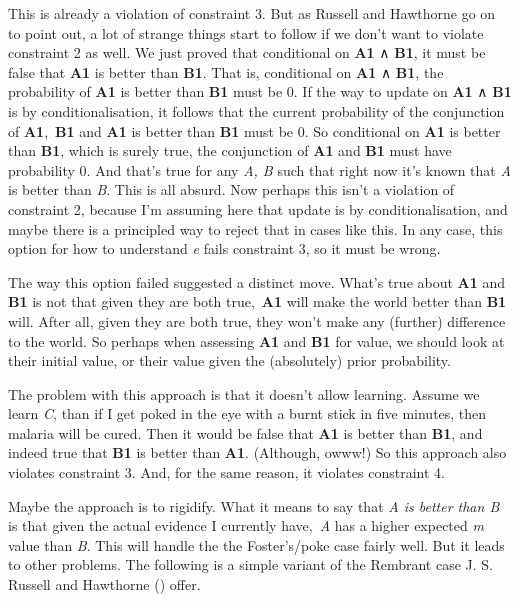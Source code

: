 \documentclass[
  10pt,
  letterpaper,
  twoside]{scrbook}
\begin{document}
This is already a violation of constraint 3. But as Russell and
Hawthorne go on to point out, a lot of strange things start to follow if
we don't want to violate constraint 2 as well. We just proved that
conditional on \textbf{A1} ∧ \textbf{B1}, it must be false that
\textbf{A1} is better than \textbf{B1}. That is, conditional on
\textbf{A1} ∧ \textbf{B1}, the probability of \textbf{A1} is better than
\textbf{B1} must be 0. If the way to update on \textbf{A1} ∧ \textbf{B1}
is by conditionalisation, it follows that the current probability of the
conjunction of \textbf{A1},~\textbf{B1} and \textbf{A1} is better than
\textbf{B1} must be 0. So conditional on \textbf{A1} is better than
\textbf{B1}, which is surely true, the conjunction of \textbf{A1} and
\textbf{B1} must have probability 0. And that's true for any \emph{A, B}
such that right now it's known that \emph{A} is better than \emph{B}.
This is all absurd. Now perhaps this isn't a violation of constraint 2,
because I'm assuming here that update is by conditionalisation, and
maybe there is a principled way to reject that in cases like this. In
any case, this option for how to understand \emph{e} fails constraint 3,
so it must be wrong.

The way this option failed suggested a distinct move. What's true about
\textbf{A1} and \textbf{B1} is not that given they are both
true,~\textbf{A1} will make the world better than \textbf{B1} will.
After all, given they are both true, they won't make any (further)
difference to the world. So perhaps when assessing \textbf{A1} and
\textbf{B1} for value, we should look at their initial value, or their
value given the (absolutely) prior probability.

The problem with this approach is that it doesn't allow learning. Assume
we learn \emph{C}, than if I get poked in the eye with a burnt stick in
five minutes, then malaria will be cured. Then it would be false that
\textbf{A1} is better than \textbf{B1}, and indeed true that \textbf{B1}
is better than \textbf{A1}. (Although, owww!) So this approach also
violates constraint 3. And, for the same reason, it violates constraint
4.

Maybe the approach is to rigidify. What it means to say that \emph{A is
better than B} is that given the actual evidence I currently
have,~\emph{A} has a higher expected \emph{m} value than \emph{B}. This
will handle the the Foster's/poke case fairly well. But it leads to
other problems. The following is a simple variant of the Rembrant case
J. S. Russell and Hawthorne () offer.
\end{document}
